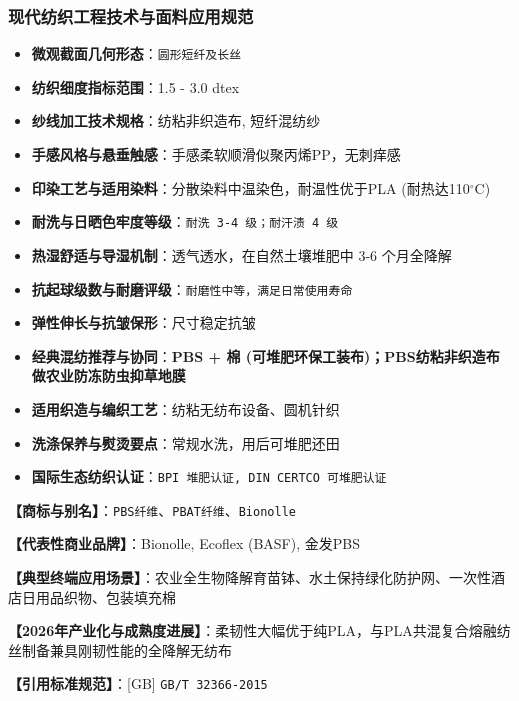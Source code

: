 \documentclass[11pt,openright,twoside,UTF8]{ctexbook}
\begin{document}
\subsubsection*{现代纺织工程技术与面料应用规范}
\begin{itemize} \setlength{\itemsep}{2pt}
    \item \textbf{微观截面几何形态}：\texttt{圆形短纤及长丝}
    \item \textbf{纺织细度指标范围}：1.5 - 3.0 dtex
    \item \textbf{纱线加工技术规格}：纺粘非织造布, 短纤混纺纱
    \item \textbf{手感风格与悬垂触感}：手感柔软顺滑似聚丙烯PP，无刺痒感
    \item \textbf{印染工艺与适用染料}：分散染料中温染色，耐温性优于PLA (耐热达110$^\circ\mathrm{C}$)
    \item \textbf{耐洗与日晒色牢度等级}：\texttt{耐洗 3-4 级；耐汗渍 4 级}
    \item \textbf{热湿舒适与导湿机制}：透气透水，在自然土壤堆肥中 3-6 个月全降解
    \item \textbf{抗起球级数与耐磨评级}：\texttt{耐磨性中等，满足日常使用寿命}
    \item \textbf{弹性伸长与抗皱保形}：尺寸稳定抗皱
    \item \textbf{经典混纺推荐与协同}：\textbf{PBS + 棉 (可堆肥环保工装布)；PBS纺粘非织造布做农业防冻防虫抑草地膜}
    \item \textbf{适用织造与编织工艺}：纺粘无纺布设备、圆机针织
    \item \textbf{洗涤保养与熨烫要点}：常规水洗，用后可堆肥还田
    \item \textbf{国际生态纺织认证}：\texttt{BPI 堆肥认证, DIN CERTCO 可堆肥认证}
\end{itemize}
\vspace{0.2cm}

\noindent\textbf{【商标与别名】}：\texttt{PBS纤维}、\texttt{PBAT纤维}、\texttt{Bionolle}\par
\noindent\textbf{【代表性商业品牌】}：Bionolle, Ecoflex (BASF), 金发PBS\par
\noindent\textbf{【典型终端应用场景】}：农业全生物降解育苗钵、水土保持绿化防护网、一次性酒店日用品织物、包装填充棉\par
\noindent\textbf{【2026年产业化与成熟度进展】}：柔韧性大幅优于纯PLA，与PLA共混复合熔融纺丝制备兼具刚韧性能的全降解无纺布\par
\noindent\textbf{【引用标准规范】}：[GB] \texttt{GB/T 32366-2015}\par
\vspace{0.5cm}
\end{document}
